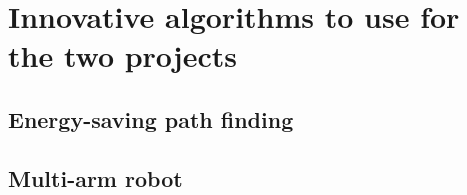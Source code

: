 \chapter{Innovative algorithms to use for the two projects}
\label{cha:algorithm}

\section{Energy-saving path finding}
\label{sec:algorithm_project1}

\section{Multi-arm robot}
\label{sec:algorithm_project2}